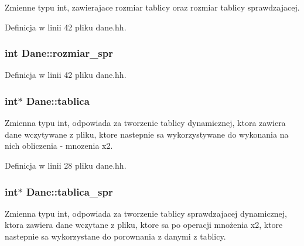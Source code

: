 \-Zmienne typu int, zawierajace rozmiar tablicy oraz rozmiar tablicy sprawdzajacej. 



\-Definicja w linii 42 pliku dane.\-hh.

\hypertarget{class_dane_ab9731edece0d6a357594c7cd02985dab}{
\subsubsection[{rozmiar\-\_\-spr}]{\setlength{\rightskip}{0pt plus 5cm}int {\bf \-Dane\-::rozmiar\-\_\-spr}}}\label{class_dane_ab9731edece0d6a357594c7cd02985dab}


\-Definicja w linii 42 pliku dane.\-hh.

\hypertarget{class_dane_a094084ea03dd13bb92c8a8eb7d4e7888}{
\subsubsection[{tablica}]{\setlength{\rightskip}{0pt plus 5cm}int$\ast$ {\bf \-Dane\-::tablica}}}\label{class_dane_a094084ea03dd13bb92c8a8eb7d4e7888}


\-Zmienna typu int, odpowiada za tworzenie tablicy dynamicznej, ktora zawiera dane wczytywane z pliku, ktore nastepnie sa wykorzystywane do wykonania na nich obliczenia -\/ mnozenia x2. 



\-Definicja w linii 28 pliku dane.\-hh.

\hypertarget{class_dane_a394973f4dcbc75d3e218ef2a31bc99f9}{
\subsubsection[{tablica\-\_\-spr}]{\setlength{\rightskip}{0pt plus 5cm}int$\ast$ {\bf \-Dane\-::tablica\-\_\-spr}}}\label{class_dane_a394973f4dcbc75d3e218ef2a31bc99f9}


\-Zmienna typu int, odpowiada za tworzenie tablicy sprawdzajacej dynamicznej, ktora zawiera dane wczytane z pliku, ktore sa po operacji mnożenia x2, ktore nastepnie sa wykorzystane do porownania z danymi z tablicy. 



